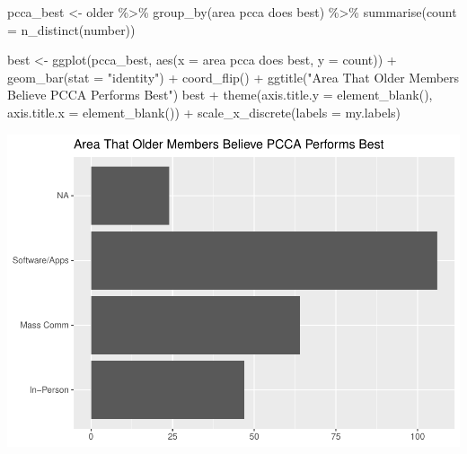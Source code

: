 \documentclass[
]{article}
\newenvironment{Shaded}{\begin{snugshade}}{\end{snugshade}}
\newcommand{\AttributeTok}[1]{\textcolor[rgb]{0.77,0.63,0.00}{#1}}
\newcommand{\FunctionTok}[1]{\textcolor[rgb]{0.00,0.00,0.00}{#1}}
\newcommand{\NormalTok}[1]{#1}
\newcommand{\OtherTok}[1]{\textcolor[rgb]{0.56,0.35,0.01}{#1}}
\newcommand{\SpecialCharTok}[1]{\textcolor[rgb]{0.00,0.00,0.00}{#1}}
\newcommand{\StringTok}[1]{\textcolor[rgb]{0.31,0.60,0.02}{#1}}
\begin{document}
\begin{Shaded}
\begin{Highlighting}[]
\NormalTok{pcca\_best }\OtherTok{\textless{}{-}}\NormalTok{ older }\SpecialCharTok{\%\textgreater{}\%}
    \FunctionTok{group\_by}\NormalTok{(}\StringTok{\textasciigrave{}}\AttributeTok{area pcca does best}\StringTok{\textasciigrave{}}\NormalTok{) }\SpecialCharTok{\%\textgreater{}\%}
    \FunctionTok{summarise}\NormalTok{(}\AttributeTok{count =} \FunctionTok{n\_distinct}\NormalTok{(number))}

\NormalTok{best }\OtherTok{\textless{}{-}} \FunctionTok{ggplot}\NormalTok{(pcca\_best, }\FunctionTok{aes}\NormalTok{(}\AttributeTok{x =} \StringTok{\textasciigrave{}}\AttributeTok{area pcca does best}\StringTok{\textasciigrave{}}\NormalTok{, }\AttributeTok{y =}\NormalTok{ count)) }\SpecialCharTok{+}
    \FunctionTok{geom\_bar}\NormalTok{(}\AttributeTok{stat =} \StringTok{"identity"}\NormalTok{) }\SpecialCharTok{+} \FunctionTok{coord\_flip}\NormalTok{() }\SpecialCharTok{+} \FunctionTok{ggtitle}\NormalTok{(}\StringTok{"Area That Older Members Believe PCCA Performs Best"}\NormalTok{)}
\NormalTok{best }\SpecialCharTok{+} \FunctionTok{theme}\NormalTok{(}\AttributeTok{axis.title.y =} \FunctionTok{element\_blank}\NormalTok{(), }\AttributeTok{axis.title.x =} \FunctionTok{element\_blank}\NormalTok{()) }\SpecialCharTok{+}
    \FunctionTok{scale\_x\_discrete}\NormalTok{(}\AttributeTok{labels =}\NormalTok{ my.labels)}
\end{Highlighting}
\end{Shaded}

\includegraphics{pcca_survey_files/figure-latex/best-old-1.pdf}
\end{document}
